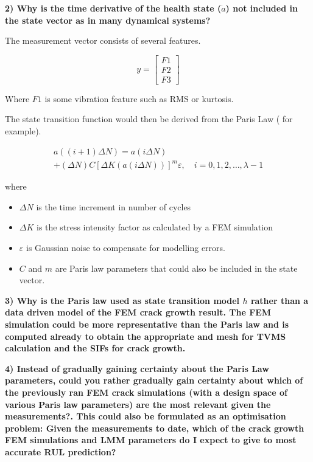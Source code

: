\textbf{2) Why is the time derivative of the health state ($\dot{a}$) not included in the state vector as in many dynamical systems?} 

The measurement vector consists of several features.

\begin{equation}
y =	\left[\begin{array}{l}
F1 \\
F2 \\
F3
\end{array}\right]
\end{equation}

Where $F1$ is some vibration feature such as RMS or kurtosis.


The state transition function would then be derived from the Paris Law (\cite{Zhao2013} for example).

\begin{equation}
\begin{array}{l}
a((i+1) \Delta N)=a(i \Delta N) \\
+(\Delta N) C[\Delta K(a(i \Delta N))]^{m} \varepsilon, \quad i=0,1,2, \ldots, \lambda-1
\end{array}
\end{equation}

where 

\begin{itemize}
	\item $\Delta N$ is the time increment in number of cycles
	\item $\Delta K$ is the stress intensity factor as calculated by a FEM simulation
	\item $\varepsilon$ is Gaussian noise to compensate for modelling errors. 
	\item $C$ and $m$ are Paris law parameters that could also be included in the state vector. 
\end{itemize}



\textbf{3) Why is the Paris law used as state transition model $h$ rather than a data driven model of the FEM crack growth result. The FEM simulation could be more representative than the Paris law and is computed already to obtain the appropriate and mesh for TVMS calculation and the SIFs for crack growth.}

\textbf{4) Instead of gradually gaining certainty about the Paris Law parameters, could you rather gradually gain certainty about which of the previously ran FEM crack simulations (with a design space of various Paris law parameters) are the most relevant given the measurements?. This could also be formulated as an optimisation problem: Given the measurements to date, which of the crack growth FEM simulations and LMM parameters do I expect to give to most accurate RUL prediction?}

